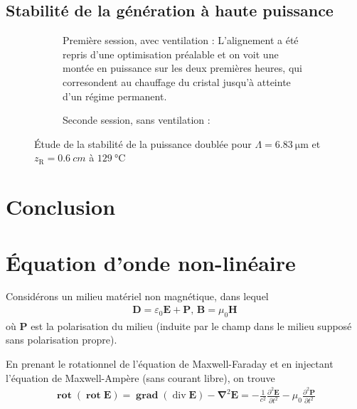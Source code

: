 \documentclass[11pt,a4paper] { article}
\newcommand{\zr}{z_\mathsc{R}}
\DeclareMathOperator{\divg}{div}
\DeclareMathOperator{\rot}{\mathbf{rot}}
\DeclareMathOperator{\grad}{\mathbf{grad}}
\newcommand{\mathsc}[1]{\mathrm{\scriptscriptstyle {#1}}}
\renewcommand{\v}[1]{\boldsymbol{\mathbf{#1}}}
\begin{document}
\subsection{Stabilité de la génération à haute puissance}


\begin{figure}[htpb]  
\centering
\begin{subfigure}[b]{\textwidth}
	\centering
	
	\caption{Première session, avec ventilation : \small L'alignement a été repris d'une optimisation préalable et on voit une montée en puissance sur les deux premières heures, qui corresondent au chauffage du cristal jusqu'à atteinte d'un régime permanent.}
	\label{fig:mesc1}
\end{subfigure}
\begin{subfigure}[b]{\textwidth}
	\centering
	
	\caption{Seconde session, sans ventilation : \small}
	\label{fig:mesc2}
\end{subfigure}
\caption{Étude de la stabilité de la puissance doublée pour $\Lambda=\SI{6.83}{\micro\meter}$ et $\zr = \SI{0.6}{cm}$ à $\SI{129}{\celsius}$}
\end{figure}


\section{Conclusion}




\newpage

\appendix
\section{\'Equation d'onde non-linéaire}  
\label{NL}
Considérons un milieu matériel non magnétique, dans lequel
\begin{align*}
	\v D = \varepsilon_0 \v E + \v P \text{, } \v B = \mu_0 \v H
\end{align*}
où $\v P$ est la polarisation du milieu (induite par le champ dans le milieu supposé sans polarisation propre).

En prenant le rotationnel de l'équation de Maxwell-Faraday et en injectant l'équation de Maxwell-Ampère (sans courant libre), on trouve
\begin{align*}
	\rot (\rot \v E) = \grad (\divg \v E) - \v \nabla^2 \v E = - \frac{1}{c^2} \frac{\partial^2 \v E}{\partial t^2} - \mu_0 \frac{\partial^2 \v P}{\partial t^2} \\
\end{align*}
\end{document}
